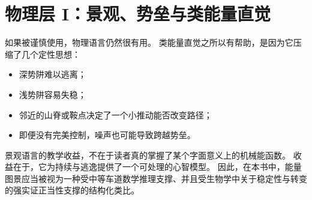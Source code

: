 \section{物理层 I：景观、势垒与类能量直觉}

如果被谨慎使用，物理语言仍然很有用。
类能量直觉之所以有帮助，是因为它压缩了几个定性思想：
\begin{itemize}[nosep]
  \item 深势阱难以逃离；
  \item 浅势阱容易失稳；
  \item 邻近的山脊或鞍点决定了一个小推动能否改变路径；
  \item 即便没有完美控制，噪声也可能导致跨越势垒。
\end{itemize}

\begin{discussion}
景观语言的教学收益，不在于读者真的掌握了某个字面意义上的机械能函数。
收益在于，它为持续与逃逸提供了一个可处理的心智模型。
因此，在本书中，能量图景应当被视为一种受中等车道数学推理支撑、并且受生物学中关于稳定性与转变的强实证正当性支撑的结构化类比。
\end{discussion}